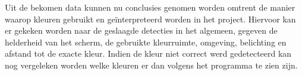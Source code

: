 Uit de bekomen data kunnen nu conclusies genomen worden omtrent de manier waarop kleuren gebruikt en geïnterpreteerd worden in het project. Hiervoor kan er gekeken worden naar de geslaagde detecties in het algemeen, gegeven de helderheid van het scherm, de gebruikte kleurruimte, omgeving, belichting en afstand tot de exacte kleur. Indien de kleur niet correct werd gedetecteerd kan nog vergeleken worden welke kleuren er dan volgens het programma te zien zijn.